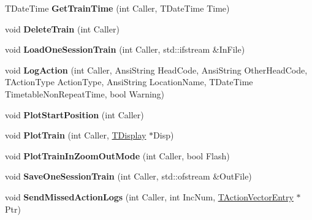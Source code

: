 \begin{DoxyCompactItemize}
\item 
\mbox{\label{class_t_train_ad249f34f6862e604b8e141d1b25fe57d}} 
T\+Date\+Time {\bfseries Get\+Train\+Time} (int Caller, T\+Date\+Time Time)
\item 
\mbox{\label{class_t_train_afd5d7ea375b8a878c31d81841acad159}} 
void {\bfseries Delete\+Train} (int Caller)
\item 
\mbox{\label{class_t_train_a23c65e7f2b2130ae87811f70afb6d5bf}} 
void {\bfseries Load\+One\+Session\+Train} (int Caller, std\+::ifstream \&In\+File)
\item 
\mbox{\label{class_t_train_a493ab1c185d29bf28ec8fded2356e9fc}} 
void {\bfseries Log\+Action} (int Caller, Ansi\+String Head\+Code, Ansi\+String Other\+Head\+Code, T\+Action\+Type Action\+Type, Ansi\+String Location\+Name, T\+Date\+Time Timetable\+Non\+Repeat\+Time, bool Warning)
\item 
\mbox{\label{class_t_train_a43cd691f12297c4c13a19791329dd627}} 
void {\bfseries Plot\+Start\+Position} (int Caller)
\item 
\mbox{\label{class_t_train_a5fdef825574f0e546ab25169e9f8445d}} 
void {\bfseries Plot\+Train} (int Caller, \mbox{\hyperlink{class_t_display}{T\+Display}} $\ast$Disp)
\item 
\mbox{\label{class_t_train_aa3f3a500264ddca35c7fee35f22ffa1e}} 
void {\bfseries Plot\+Train\+In\+Zoom\+Out\+Mode} (int Caller, bool Flash)
\item 
\mbox{\label{class_t_train_ac414e9e4fd7e25c11e09678dd4dc7944}} 
void {\bfseries Save\+One\+Session\+Train} (int Caller, std\+::ofstream \&Out\+File)
\item 
\mbox{\label{class_t_train_a29ad7cb992931e1e8922941fc49e2e74}} 
void {\bfseries Send\+Missed\+Action\+Logs} (int Caller, int Inc\+Num, \mbox{\hyperlink{class_t_action_vector_entry}{T\+Action\+Vector\+Entry}} $\ast$Ptr)
\item 
\mbox{\label{class_t_train_aaa6289d279b229d05963f8b3a35d53e9}} 

\end{DoxyCompactItemize}
